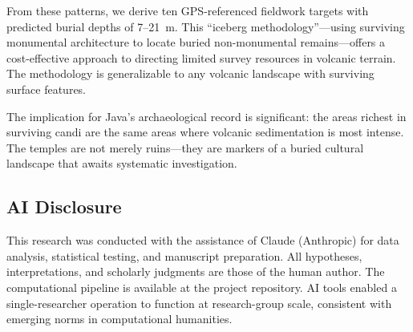 \documentclass[12pt,a4paper]{article}
\begin{document}
From these patterns, we derive ten GPS-referenced fieldwork targets with predicted burial depths of 7--21~m. This ``iceberg methodology''---using surviving monumental architecture to locate buried non-monumental remains---offers a cost-effective approach to directing limited survey resources in volcanic terrain. The methodology is generalizable to any volcanic landscape with surviving surface features.

The implication for Java's archaeological record is significant: the areas richest in surviving candi are the same areas where volcanic sedimentation is most intense. The temples are not merely ruins---they are markers of a buried cultural landscape that awaits systematic investigation.


\subsection*{AI Disclosure}

This research was conducted with the assistance of Claude (Anthropic) for data analysis, statistical testing, and manuscript preparation. All hypotheses, interpretations, and scholarly judgments are those of the human author. The computational pipeline is available at the project repository. AI tools enabled a single-researcher operation to function at research-group scale, consistent with emerging norms in computational humanities.



\end{document}
